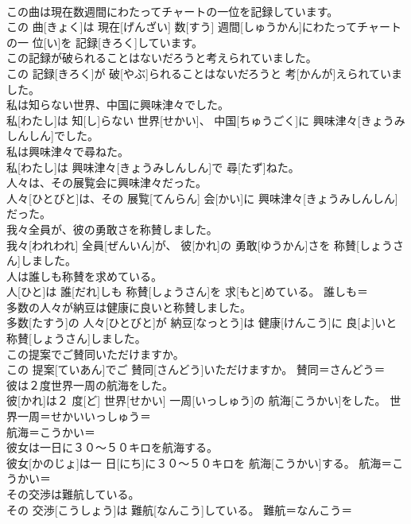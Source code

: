 \documentclass[8pt]{extreport}
\begin{document}
\begin{CJK}{UTF8}{min}
\\	この曲は現在数週間にわたってチャートの一位を記録しています。	
\\	この 曲[きょく]は 現在[げんざい] 数[すう] 週間[しゅうかん]にわたってチャートの一 位[い]を 記録[きろく]しています。	
\\	この記録が破られることはないだろうと考えられていました。	
\\	この 記録[きろく]が 破[やぶ]られることはないだろうと 考[かんが]えられていました。	
\\	私は知らない世界、中国に興味津々でした。	
\\	私[わたし]は 知[し]らない 世界[せかい]、 中国[ちゅうごく]に 興味津々[きょうみしんしん]でした。	
\\	私は興味津々で尋ねた。	
\\	私[わたし]は 興味津々[きょうみしんしん]で 尋[たず]ねた。	
\\	人々は、その展覧会に興味津々だった。	
\\	人々[ひとびと]は、その 展覧[てんらん] 会[かい]に 興味津々[きょうみしんしん]だった。	
\\	我々全員が、彼の勇敢さを称賛しました。	
\\	我々[われわれ] 全員[ぜんいん]が、 彼[かれ]の 勇敢[ゆうかん]さを 称賛[しょうさん]しました。	
\\	人は誰しも称賛を求めている。	
\\	人[ひと]は 誰[だれ]しも 称賛[しょうさん]を 求[もと]めている。	誰しも＝ 
\\	多数の人々が納豆は健康に良いと称賛しました。	
\\	多数[たすう]の 人々[ひとびと]が 納豆[なっとう]は 健康[けんこう]に 良[よ]いと 称賛[しょうさん]しました。	
\\	この提案でご賛同いただけますか。	
\\	この 提案[ていあん]でご 賛同[さんどう]いただけますか。	賛同＝さんどう＝ 
\\	彼は２度世界一周の航海をした。	
\\	彼[かれ]は２ 度[ど] 世界[せかい] 一周[いっしゅう]の 航海[こうかい]をした。	世界一周＝せかいいっしゅう＝ 
\\	航海＝こうかい＝ 
\\	彼女は一日に３０〜５０キロを航海する。	
\\	彼女[かのじょ]は一 日[にち]に３０〜５０キロを 航海[こうかい]する。	航海＝こうかい＝ 
\\	その交渉は難航している。	
\\	その 交渉[こうしょう]は 難航[なんこう]している。	難航＝なんこう＝ 

\end{CJK}
\end{document}
